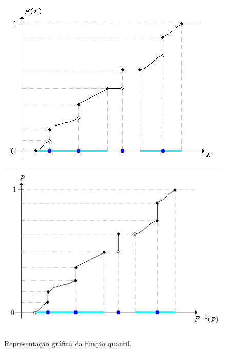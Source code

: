 \begin{frame}
	\begin{figure}[!htb]
		\begin{center}
			\includegraphics[scale=0.3]{CDFMixed.png} \includegraphics[scale=0.3]{QuantileFunction.png} 
			\caption{\label{figquant} Representação gráfica da função quantil.}
		\end{center}
	\end{figure}
	
\end{frame}



